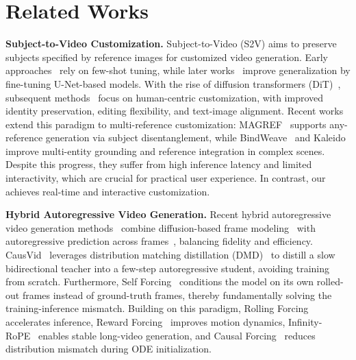 \section{Related Works}

\noindent
\textbf{Subject-to-Video Customization.}
%
Subject-to-Video (S2V) aims to preserve subjects specified by reference images for customized video generation.
% 
Early approaches~\cite{wang2026customvideo,chen2024disenstudio} rely on few-shot tuning, while later works~\cite{he2024id,yuan2025identity} improve generalization by fine-tuning U-Net-based models.
% 
With the rise of diffusion transformers (DiT)~\cite{peebles2023scalable,bao2023all}, subsequent methods~\cite{vace,fei2025skyreels,xue2025stand,liu2025phantom} focus on human-centric customization, with improved identity preservation, editing flexibility, and text-image alignment.
% 
Recent works extend this paradigm to multi-reference customization:
MAGREF~\cite{deng2025magref} supports any-reference generation via subject disentanglement, while BindWeave~\cite{li2025bindweave} and Kaleido~\cite{zhang2025kaleido} improve multi-entity grounding and reference integration in complex scenes.
% 
Despite this progress, they suffer from high inference latency and limited interactivity, which are crucial for practical user experience.
% 
In contrast, our \method achieves real-time and interactive customization.





\noindent
\textbf{Hybrid Autoregressive Video Generation.}
%
Recent hybrid autoregressive video generation methods~\cite{chen2024diffusion,yin2025slow,huang2025self,zhu2026causal} combine diffusion-based frame modeling~\cite{kong2024hunyuanvideo,yang2024cogvideox,wan2025wan} with autoregressive prediction across frames~\cite{kondratyuk2023videopoet,sun2024autoregressive}, balancing fidelity and efficiency.
% 
CausVid~\cite{yin2025slow} leverages distribution matching distillation (DMD)~\cite{yin2024improved} to distill a slow bidirectional teacher into a few-step autoregressive student, avoiding training from scratch.
% 
Furthermore, Self Forcing~\cite{huang2025self} conditions the model on its own rolled-out frames instead of ground-truth frames, thereby fundamentally solving the training-inference mismatch.
% 
Building on this paradigm, Rolling Forcing~\cite{liu2025rolling} accelerates inference, Reward Forcing~\cite{lu2025reward} improves motion dynamics, Infinity-RoPE~\cite{yesiltepe2025infinity} enables stable long-video generation, and Causal Forcing~\cite{zhu2026causal} reduces distribution mismatch during ODE initialization.





